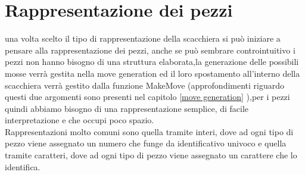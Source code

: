 \section{Rappresentazione dei pezzi}
una volta scelto il tipo di rappresentazione della scacchiera si può iniziare a pensare alla rappresentazione dei pezzi,
anche se può sembrare controintuitivo i pezzi non hanno bisogno di una struttura elaborata,la generazione delle possibili
mosse verrà gestita nella move generation ed il loro spostamento all'interno della scacchiera verrà gestito dalla funzione
MakeMove (approfondimenti riguardo questi due argomenti sono presenti nel capitolo \ref{move generation}  ),per i pezzi quindi abbiamo bisogno di una
rappresentazione semplice, di facile interpretazione e che occupi poco spazio.\\Rappresentazioni molto comuni sono quella
tramite interi, dove ad ogni tipo di pezzo viene assegnato un numero che funge da identificativo univoco e quella tramite
caratteri, dove ad ogni tipo di pezzo viene assegnato un carattere che lo identifica.



